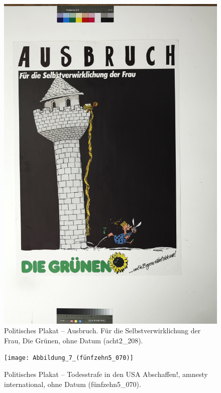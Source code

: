 \documentclass[a4paper,12pt,ngerman]{article}
\begin{document}
\newpage
\begin{figure}[ht]
\includegraphics[width=\linewidth]{Abbildung_6_(acht2_208)}
\centering
\caption{Politisches Plakat -- Ausbruch. Für die Selbstverwirklichung der Frau, Die Grünen, ohne Datum (acht2\_208).}
\end{figure}

\newpage
\begin{figure}[ht]
\texttt{[image: Abbildung\_7\_(fünfzehn5\_070)]}
\centering
\caption{Politisches Plakat -- Todesstrafe in den USA Abschaffen!, amnesty international, ohne Datum (fünfzehn5\_070).}
\end{figure}
\end{document}
